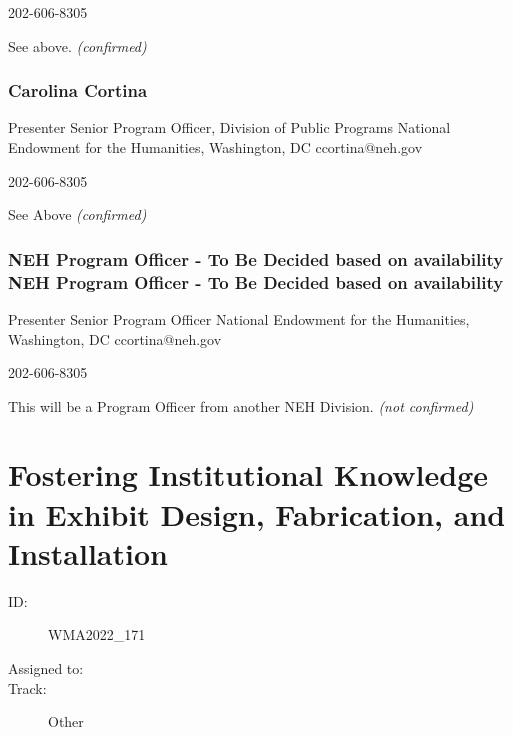 \documentclass{report}
\begin{document}
                202-606-8305\newline

                See above.\newline
                \emph{ (confirmed) }
              

              
                \subsubsection*{ Carolina Cortina }
                Presenter\newline
                Senior Program Officer, Division of Public Programs\newline
                National Endowment for the Humanities, Washington, DC
                \newline
                ccortina@neh.gov\newline
                
                202-606-8305\newline

                See Above
                \emph{ (confirmed) }
              

              
                \subsubsection*{ NEH Program Officer - To Be Decided based on availability NEH Program Officer - To Be Decided based on availability }
                Presenter\newline
                Senior Program Officer\newline
                National Endowment for the Humanities, Washington, DC
                \newline
                ccortina@neh.gov\newline
                
                202-606-8305\newline

                This will be a Program Officer from another NEH Division.
                \emph{ (not confirmed) }
              

              

              
        
          \newpage
          \section{ Fostering Institutional Knowledge in Exhibit Design, Fabrication, and Installation }
            \begin{description}
              \item [ID:]
              WMA2022\_171

              \item [Assigned to:]
                \item [Track:]Other~
              \end{description}
\end{document}
